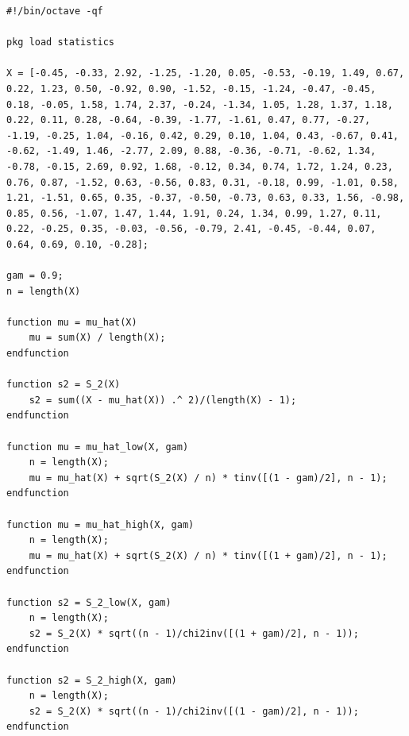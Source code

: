 \begin{lstlisting}
#!/bin/octave -qf

pkg load statistics

X = [-0.45, -0.33, 2.92, -1.25, -1.20, 0.05, -0.53, -0.19, 1.49, 0.67, 0.22, 1.23, 0.50, -0.92, 0.90, -1.52, -0.15, -1.24, -0.47, -0.45, 0.18, -0.05, 1.58, 1.74, 2.37, -0.24, -1.34, 1.05, 1.28, 1.37, 1.18, 0.22, 0.11, 0.28, -0.64, -0.39, -1.77, -1.61, 0.47, 0.77, -0.27, -1.19, -0.25, 1.04, -0.16, 0.42, 0.29, 0.10, 1.04, 0.43, -0.67, 0.41, -0.62, -1.49, 1.46, -2.77, 2.09, 0.88, -0.36, -0.71, -0.62, 1.34, -0.78, -0.15, 2.69, 0.92, 1.68, -0.12, 0.34, 0.74, 1.72, 1.24, 0.23, 0.76, 0.87, -1.52, 0.63, -0.56, 0.83, 0.31, -0.18, 0.99, -1.01, 0.58, 1.21, -1.51, 0.65, 0.35, -0.37, -0.50, -0.73, 0.63, 0.33, 1.56, -0.98, 0.85, 0.56, -1.07, 1.47, 1.44, 1.91, 0.24, 1.34, 0.99, 1.27, 0.11, 0.22, -0.25, 0.35, -0.03, -0.56, -0.79, 2.41, -0.45, -0.44, 0.07, 0.64, 0.69, 0.10, -0.28];

gam = 0.9;
n = length(X)

function mu = mu_hat(X)
    mu = sum(X) / length(X);
endfunction

function s2 = S_2(X)
    s2 = sum((X - mu_hat(X)) .^ 2)/(length(X) - 1);
endfunction

function mu = mu_hat_low(X, gam)
    n = length(X);
    mu = mu_hat(X) + sqrt(S_2(X) / n) * tinv([(1 - gam)/2], n - 1);
endfunction

function mu = mu_hat_high(X, gam)
    n = length(X);
    mu = mu_hat(X) + sqrt(S_2(X) / n) * tinv([(1 + gam)/2], n - 1);
endfunction

function s2 = S_2_low(X, gam)
    n = length(X);
    s2 = S_2(X) * sqrt((n - 1)/chi2inv([(1 + gam)/2], n - 1));
endfunction

function s2 = S_2_high(X, gam)
    n = length(X);
    s2 = S_2(X) * sqrt((n - 1)/chi2inv([(1 - gam)/2], n - 1));
endfunction
\end{lstlisting}

\clearpage

